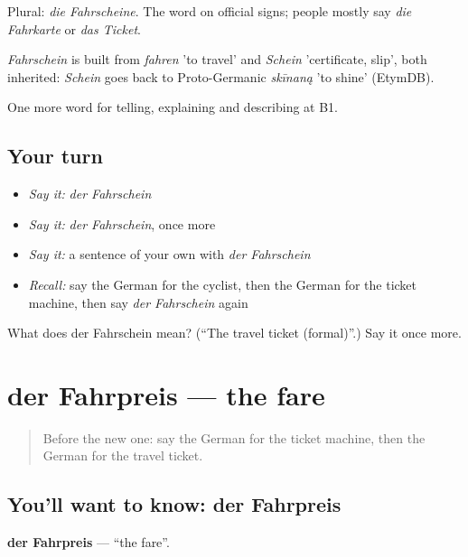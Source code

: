 Plural: \emph{die Fahrscheine}. The word on official signs; people mostly say \emph{die Fahrkarte} or \emph{das Ticket}.

\begin{cousinweb}
\emph{Fahrschein} is built from \emph{fahren} 'to travel' and \emph{Schein} 'certificate, slip', both inherited: \emph{Schein} goes back to Proto-Germanic \emph{skīnaną} 'to shine' (EtymDB).
\end{cousinweb}

\begin{grammarlens}[title={What you've built}]
One more word for telling, explaining and describing at B1.
\end{grammarlens}

\subsection*{Your turn}
\begin{itemize}
\raggedright
  \item \emph{Say it:} \emph{der Fahrschein}
  \item \emph{Say it:} \emph{der Fahrschein}, once more
  \item \emph{Say it:} a sentence of your own with \emph{der Fahrschein}
  \item \emph{Recall:} say the German for the cyclist, then the German for the ticket machine, then say \emph{der Fahrschein} again
\end{itemize}

\begin{tcolorbox}[breakable,colback=teal!4,colframe=teal!35!black,title={Before you move on}]
What does der Fahrschein mean? (\textquotedblleft{}The travel ticket (formal)\textquotedblright{}.) Say it once more.
\end{tcolorbox}
\section[der Fahrpreis]{der Fahrpreis — the fare}

\label{lesson:GE-C411-fahrpreis}



\begin{quote}
Before the new one: say the German for the ticket machine, then the German for the travel ticket.
\end{quote}

\subsection*{You'll want to know: der Fahrpreis}
\textbf{der Fahrpreis} — \textquotedblleft{}the fare\textquotedblright{}.

